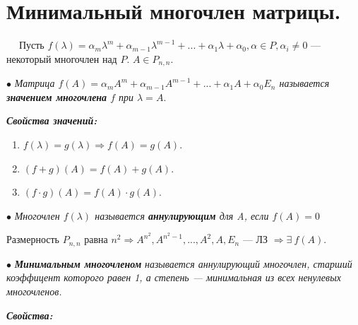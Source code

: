 \documentclass[a4paper, 12pt]{report}
\begin{document}
	
	
	
	
	
	
	\section{Минимальный многочлен матрицы.}
	$\quad \;$Пусть $f(\lambda) = \alpha_m \lambda^m + \alpha_{m-1} \lambda^{m-1} + ... + \alpha_1 \lambda + \alpha_0, \alpha \in P, \alpha_i \ne 0$ --- некоторый многочлен над $P$. $A \in P_{n,n}$.
	
	$\bullet$ \textit{Матрица $f(A) = \alpha_m A^m + \alpha_{m-1} A^{m-1} + ... + \alpha_1 A + \alpha_0 E_n$ называется \textbf{значением многочлена} $f$ при $\lambda = A.$}
	\par\bigskip
	\textit{\textbf{Свойства значений:}}
	\begin{enumerate}
		\item $f(\lambda) = g(\lambda) \Rightarrow f(A)  = g(A)$.
		\item $(f+g) (A) = f(A) + g(A)$.
		\item $(f\cdot g) (A) = f(A) \cdot g(A)$.
	\end{enumerate}
	\par
	$\bullet$ \textit{Многочлен $f(\lambda)$ называется \textbf{\textit{аннулирующим}} для A, если $f(A) = 0$}
	\par\bigskip
	Размерность $P_{n,n}$ равна  $n^2 \Rightarrow A^{n^2}, A^{n^2 - 1}, ..., A^2, A, E_n$ --- ЛЗ $\Rightarrow \exists\ f(A)$.
	\par\bigskip
	$\bullet$ \textbf{\textit{Минимальным многочленом}} \textit{называется аннулирующий многочлен, старший коэффицент которого равен 1, а степень --- минимальная из всех ненулевых многочленов.}
	\par\bigskip
	\textit{\textbf{Свойства:}}
\end{document}
